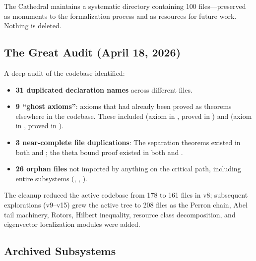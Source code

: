 \documentclass[11pt,a4paper]{article}
\begin{document}
The Cathedral maintains a systematic  directory containing
100 files---preserved as monuments to the
formalization process and as resources for future work. Nothing is deleted.

\subsection{The Great Audit (April 18, 2026)}

A deep audit of the codebase identified:
\begin{itemize}
  \item \textbf{31 duplicated declaration names} across different files.
  \item \textbf{9 ``ghost axioms''}: axioms that had already been proved
    as theorems elsewhere in the codebase. These included
     (axiom in ,
    proved in ) and
     (axiom in ,
    proved in ).
  \item \textbf{3 near-complete file duplications}: The separation
    theorems existed in both  and ;
    the theta bound proof existed in both  and
    .
  \item \textbf{26 orphan files} not imported by anything on the critical
    path, including entire subsystems (, ,
    ).
\end{itemize}

The cleanup reduced the active codebase from 178 to 161 files in v8;
subsequent explorations (v9--v15) grew the active tree to 208 files
as the Perron chain, Abel tail machinery, Rotors, Hilbert inequality,
resource class decomposition, and eigenvector localization modules
were added.

\subsection{Archived Subsystems}
\end{document}
